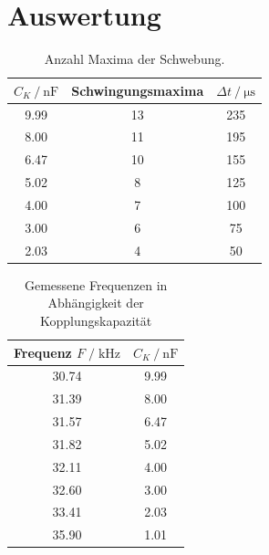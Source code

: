 \section{Auswertung}
\label{sec:Auswertung}


\begin{table}
  \centering
  \caption{Anzahl Maxima der Schwebung.}
  \label{tab:schwing_maxima}
  \begin{tabular}{c c c}
      \toprule
      {$C_K \:/\: \si{\nano\farad}$} & Schwingungsmaxima & $\Delta t\:/\: \si{\micro\second}$ \\
      \midrule
      9.99  & 13 & 235 \\ 
      8.00  & 11 & 195 \\ 
      6.47  & 10 & 155 \\ 
      5.02 & 8 & 125 \\ 
      4.00 & 7 & 100 \\
      3.00 & 6 & 75 \\
      2.03 & 4 & 50\\ 
      \bottomrule
  \end{tabular}
\end{table}

\begin{table}
  \centering
  \caption{Gemessene Frequenzen in Abhängigkeit der Kopplungskapazität}
  \label{tab:frequenzen}
  \begin{tabular}{c c}
      \toprule
      {Frequenz $F\;/\; \si{\kilo\hertz}$} & {$C_K \:/\: \si{\nano\farad}$} \\
      \midrule
      30.74 & 9.99 \\
      31.39 & 8.00 \\
      31.57 & 6.47 \\
      31.82 & 5.02 \\
      32.11 & 4.00 \\
      32.60 & 3.00 \\
      33.41 & 2.03 \\
      35.90 & 1.01 \\
      \bottomrule
  \end{tabular}
\end{table}


